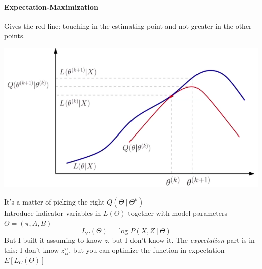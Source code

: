 \documentclass[10pt]{report}
\begin{document}
\paragraph{Expectation-Maximization} Gives the red line: touching in the estimating point and not greater in the other points.
\begin{center}
	\includegraphics[scale=0.5]{30.png}
\end{center}
It's a matter of picking the right $Q(\Theta\:|\:\Theta^k)$\\
Introduce indicator variables in $L(\Theta)$ together with model parameters $\Theta = (\pi,A,B)$
$$L_C(\Theta)=\log P(X,Z\:|\:\Theta) = $$ %
But I built it assuming to know $z$, but I don't know it. The \textit{expectation} part is in this: I don't know $z_{ti}^n$, but you can optimize the function in expectation $E[L_C(\Theta)]$\\
\end{document}
